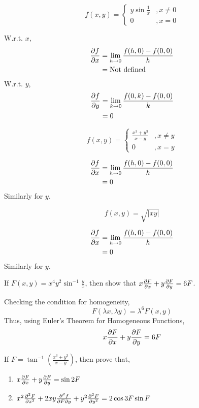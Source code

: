 \begin{asign}
	\[f(x,y)=\begin{cases}
		y\sin\frac{1}{x} &, x\neq0\\
		0 &, x=0
	\end{cases}\]
\end{asign}
\begin{anse}
	W.r.t. $x$,
	\[\begin{split}
		\pdv{f}{x}&=\lim\limits_{h\to0}\frac{f(h,0)-f(0,0)}{h}\\
		&= \text{Not defined}
	\end{split}\]
	W.r.t. $y$,
	\[\begin{split}
		\pdv{f}{y}&=\lim\limits_{k\to0}\frac{f(0,k)-f(0,0)}{k}\\
		&=0
	\end{split}\]
\end{anse}
\begin{asign}
	\[f(x,y)=\begin{cases}
		\frac{x^3+y^3}{x-y} &, x\neq y\\
		0 &, x=y
	\end{cases}\]
\end{asign}
\begin{anse}
	\[\begin{split}
		\pdv{f}{x}&=\lim\limits_{h\to0}\frac{f(h,0)-f(0,0)}{h}\\
		&=0
	\end{split}\]
	Similarly for $y$.
\end{anse}
\begin{asign}
	\[f(x,y)=\sqrt{|xy|}\]
\end{asign}
\begin{anse}
	\[\begin{split}
		\pdv{f}{x}&=\lim\limits_{h\to0}\frac{f(h,0)-f(0,0)}{h}\\
		&=0
	\end{split}\]
	Similarly for $y$.
\end{anse}
\begin{asign}
	If $F(x,y)=x^4y^2\sin^{-1}\frac{y}{x}$, then show that $x\pdv{F}{x}+y\pdv{F}{y}=6F$.
\end{asign}
\begin{anse}
	Checking the condition for homogeneity,
	\[F(\lambda x,\lambda y)=\lambda^6 F(x,y)\]
	Thus, using Euler's Theorem for Homogeneous Functions,
	\[x\pdv{F}{x}+y\pdv{F}{y}=6F\]
\end{anse}
\begin{asign}
	If $F=\tan^{-1}\left(\frac{x^3+y^3}{x-y}\right)$, then prove that, \begin{enumerate}
		\item $x\pdv{F}{x}+y\pdv{F}{y}=\sin2F$
		\item $x^2\pdv[2]{F}{x}+2xy\pdv{f}{F}{y}+y^2\pdv[2]{F}{y}=2\cos3F\sin F$
	\end{enumerate}
\end{asign}
